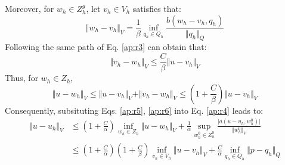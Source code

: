 Moreover, for $w_h \in Z^g_h$, let $v_h\in V_h$ satisfies that:
\begin{equation}
    \Vert w_h-v_h \Vert_V =\frac{1}{\beta} \inf_{q_h \in Q_h} \frac{b(w_h-v_h,q_h)}{\Vert q_h \Vert_Q}
\end{equation}
Following the same path of Eq. \eqref{ap:r3} can obtain that:
\begin{equation}
\Vert v_h-w_h \Vert_V \le\frac{C}{\beta} \Vert u-v_h \Vert_V
\end{equation}
Thus, for $w_h \in Z_h$,
\begin{equation}\label{ap:r6}
\Vert u-w_h \Vert_V \le \Vert u-v_h \Vert_V + \Vert v_h-w_h \Vert_V \le (1+\frac{C}{\beta})\Vert u-v_h \Vert_V
\end{equation}
Consequently, subsituting Eqs. \eqref{ap:r5}, \eqref{ap:r6} into Eq. \eqref{ap:r4} leads to:
\begin{equation}\label{ap:estimator2}
\begin{split}
\Vert u-u_h \Vert_V &\le (1+\frac{C}{\alpha}) \inf_{w_h \in Z_h}\Vert u-w_h \Vert_V + \frac{1}{\alpha}\sup_{w^0_h \in Z^0_h} \frac{\vert a(u-u_h,w^0_h) \vert}{\Vert w^0_h \Vert_V} \\
&\le(1+\frac{C}{\alpha})(1+\frac{C}{\beta}) \inf_{v_h \in V_h} \Vert u-v_h \Vert_V +\frac{C}{\alpha} \inf_{q_h \in Q_h} \Vert p-q_h \Vert_Q
\end{split}
\end{equation}


